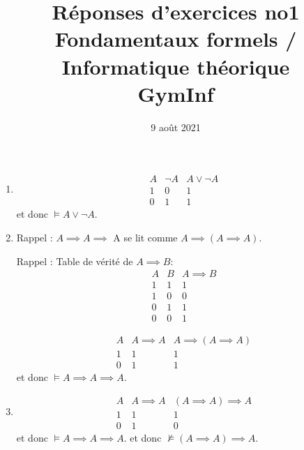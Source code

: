\documentclass[12pt,french,a4paper]{article}
\begin{document}
\title{\vspace{-2cm}Réponses d'exercices no1\\\large{Fondamentaux formels / Informatique théorique\\GymInf}}
\date{\vspace{-1cm}9 août 2021}

\maketitle

\begin{question}
\begin{enumerate}

\item \begin{displaymath}
\begin{array}{c|ccc}
A  & \neg A & A \vee \neg A\\
\hline
1 & 0 & 1\\
0 & 1 & 1
\end{array} 
\end{displaymath}
et donc $\vDash A \vee \neg A.$

\item Rappel : $A \implies A \implies$ A se lit comme $A \implies (A \implies A).$

Rappel : Table de vérité de $A \implies B$:
\begin{displaymath}
\begin{array}{cc|c}
A & B & A \implies B\\
\hline
1 & 1 & 1\\
1 & 0 & 0\\
0 & 1 & 1\\
0 & 0 & 1
\end{array}
\end{displaymath}

\begin{displaymath}
\begin{array}{c|ccc}
A  & A \implies A & A \implies (A \implies A)\\
\hline
1 & 1 & 1\\
0 & 1 & 1
\end{array} 
\end{displaymath}
et donc $\vDash A \implies A \implies A.$

\item \begin{displaymath}
\begin{array}{c|ccc}
A  & A \implies A & (A \implies A) \implies A\\
\hline
1 & 1 & 1\\
0 & 1 & 0
\end{array} 
\end{displaymath}
et donc $\vDash A \implies A \implies A.$
et donc $\not\vDash (A \implies A) \implies A.$


\end{enumerate}
\end{question}
\end{document}
